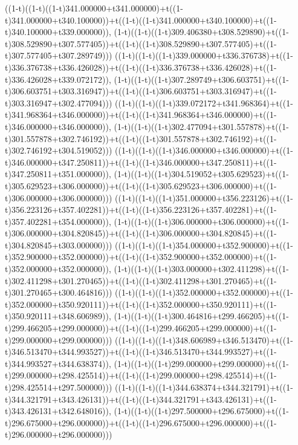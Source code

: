 ((1-t)((1-t)((1-t)341.000000+t341.000000)+t((1-t)341.000000+t340.100000))+t((1-t)((1-t)341.000000+t340.100000)+t((1-t)340.100000+t339.000000)),                                     (1-t)((1-t)((1-t)309.406380+t308.529890)+t((1-t)308.529890+t307.577405))+t((1-t)((1-t)308.529890+t307.577405)+t((1-t)307.577405+t307.289749)))
((1-t)((1-t)((1-t)339.000000+t336.376738)+t((1-t)336.376738+t336.426028))+t((1-t)((1-t)336.376738+t336.426028)+t((1-t)336.426028+t339.072172)),                                     (1-t)((1-t)((1-t)307.289749+t306.603751)+t((1-t)306.603751+t303.316947))+t((1-t)((1-t)306.603751+t303.316947)+t((1-t)303.316947+t302.477094)))
((1-t)((1-t)((1-t)339.072172+t341.968364)+t((1-t)341.968364+t346.000000))+t((1-t)((1-t)341.968364+t346.000000)+t((1-t)346.000000+t346.000000)),                                     (1-t)((1-t)((1-t)302.477094+t301.557878)+t((1-t)301.557878+t302.746192))+t((1-t)((1-t)301.557878+t302.746192)+t((1-t)302.746192+t304.519052)))
((1-t)((1-t)((1-t)346.000000+t346.000000)+t((1-t)346.000000+t347.250811))+t((1-t)((1-t)346.000000+t347.250811)+t((1-t)347.250811+t351.000000)),                                     (1-t)((1-t)((1-t)304.519052+t305.629523)+t((1-t)305.629523+t306.000000))+t((1-t)((1-t)305.629523+t306.000000)+t((1-t)306.000000+t306.000000)))
((1-t)((1-t)((1-t)351.000000+t356.223126)+t((1-t)356.223126+t357.402281))+t((1-t)((1-t)356.223126+t357.402281)+t((1-t)357.402281+t354.000000)),                                     (1-t)((1-t)((1-t)306.000000+t306.000000)+t((1-t)306.000000+t304.820845))+t((1-t)((1-t)306.000000+t304.820845)+t((1-t)304.820845+t303.000000)))
((1-t)((1-t)((1-t)354.000000+t352.900000)+t((1-t)352.900000+t352.000000))+t((1-t)((1-t)352.900000+t352.000000)+t((1-t)352.000000+t352.000000)),                                     (1-t)((1-t)((1-t)303.000000+t302.411298)+t((1-t)302.411298+t301.270465))+t((1-t)((1-t)302.411298+t301.270465)+t((1-t)301.270465+t300.464816)))
((1-t)((1-t)((1-t)352.000000+t352.000000)+t((1-t)352.000000+t350.920111))+t((1-t)((1-t)352.000000+t350.920111)+t((1-t)350.920111+t348.606989)),                                     (1-t)((1-t)((1-t)300.464816+t299.466205)+t((1-t)299.466205+t299.000000))+t((1-t)((1-t)299.466205+t299.000000)+t((1-t)299.000000+t299.000000)))
((1-t)((1-t)((1-t)348.606989+t346.513470)+t((1-t)346.513470+t344.993527))+t((1-t)((1-t)346.513470+t344.993527)+t((1-t)344.993527+t344.638374)),                                     (1-t)((1-t)((1-t)299.000000+t299.000000)+t((1-t)299.000000+t298.425514))+t((1-t)((1-t)299.000000+t298.425514)+t((1-t)298.425514+t297.500000)))
((1-t)((1-t)((1-t)344.638374+t344.321791)+t((1-t)344.321791+t343.426131))+t((1-t)((1-t)344.321791+t343.426131)+t((1-t)343.426131+t342.648016)),                                     (1-t)((1-t)((1-t)297.500000+t296.675000)+t((1-t)296.675000+t296.000000))+t((1-t)((1-t)296.675000+t296.000000)+t((1-t)296.000000+t296.000000)))

